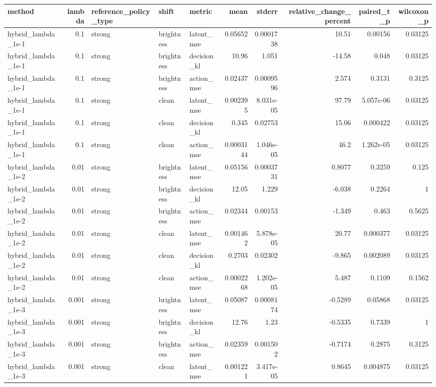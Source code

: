 \begin{tabular}{lrlllrrrrr}
\toprule
method & lambda & reference\_policy\_type & shift & metric & mean & stderr & relative\_change\_percent & paired\_t\_p & wilcoxon\_p \\
\midrule
hybrid\_lambda\_1e-1 & 0.1 & strong & brightness & latent\_mse & 0.05652 & 0.0001738 & 10.51 & 0.00156 & 0.03125 \\
hybrid\_lambda\_1e-1 & 0.1 & strong & brightness & decision\_kl & 10.96 & 1.051 & -14.58 & 0.048 & 0.03125 \\
hybrid\_lambda\_1e-1 & 0.1 & strong & brightness & action\_mse & 0.02437 & 0.0009596 & 2.574 & 0.3131 & 0.3125 \\
hybrid\_lambda\_1e-1 & 0.1 & strong & clean & latent\_mse & 0.002395 & 8.031e-05 & 97.79 & 5.057e-06 & 0.03125 \\
hybrid\_lambda\_1e-1 & 0.1 & strong & clean & decision\_kl & 0.345 & 0.02753 & 15.06 & 0.000422 & 0.03125 \\
hybrid\_lambda\_1e-1 & 0.1 & strong & clean & action\_mse & 0.0003144 & 1.046e-05 & 46.2 & 1.262e-05 & 0.03125 \\
hybrid\_lambda\_1e-2 & 0.01 & strong & brightness & latent\_mse & 0.05156 & 0.0003731 & 0.8077 & 0.3259 & 0.125 \\
hybrid\_lambda\_1e-2 & 0.01 & strong & brightness & decision\_kl & 12.05 & 1.229 & -6.038 & 0.2264 & 1 \\
hybrid\_lambda\_1e-2 & 0.01 & strong & brightness & action\_mse & 0.02344 & 0.00153 & -1.349 & 0.463 & 0.5625 \\
hybrid\_lambda\_1e-2 & 0.01 & strong & clean & latent\_mse & 0.001462 & 5.878e-05 & 20.77 & 0.000377 & 0.03125 \\
hybrid\_lambda\_1e-2 & 0.01 & strong & clean & decision\_kl & 0.2703 & 0.02302 & -9.865 & 0.002089 & 0.03125 \\
hybrid\_lambda\_1e-2 & 0.01 & strong & clean & action\_mse & 0.0002268 & 1.202e-05 & 5.487 & 0.1109 & 0.1562 \\
hybrid\_lambda\_1e-3 & 0.001 & strong & brightness & latent\_mse & 0.05087 & 0.0008174 & -0.5289 & 0.05868 & 0.03125 \\
hybrid\_lambda\_1e-3 & 0.001 & strong & brightness & decision\_kl & 12.76 & 1.23 & -0.5335 & 0.7339 & 1 \\
hybrid\_lambda\_1e-3 & 0.001 & strong & brightness & action\_mse & 0.02359 & 0.001502 & -0.7174 & 0.2875 & 0.3125 \\
hybrid\_lambda\_1e-3 & 0.001 & strong & clean & latent\_mse & 0.001221 & 3.417e-05 & 0.8645 & 0.004875 & 0.03125 \\

\end{tabular}
